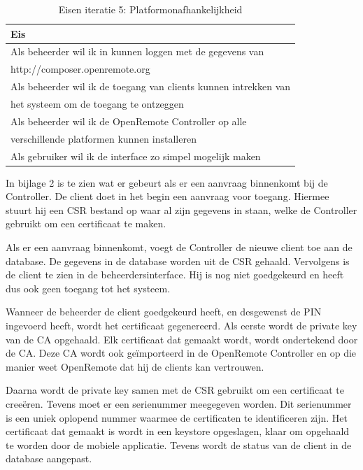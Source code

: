 \documentclass[]{article}
\begin{document}
\begin{table}[htpb]
  \caption{Eisen iteratie 5: Platformonafhankelijkheid}
  \begin{center}
    \begin{tabular}{|| l ||}\hline
        Eis                                                              \\\hline\hline
        Als beheerder wil ik in kunnen loggen met de gegevens van        \\
        http://composer.openremote.org                                   \\\hline
        Als beheerder wil ik de toegang van clients kunnen intrekken van \\ 
        het systeem om de toegang te ontzeggen                           \\\hline
        Als beheerder wil ik de OpenRemote Controller op alle            \\ 
        verschillende platformen kunnen installeren                      \\\hline
        Als gebruiker wil ik de interface zo simpel mogelijk maken       \\\hline
    \end{tabular}
  \end{center}
\end{table}

In bijlage 2 is te zien wat er gebeurt als er een
aanvraag binnenkomt bij de Controller. De client doet in het begin een aanvraag
voor toegang. Hiermee stuurt hij een CSR bestand op waar al zijn gegevens in staan,
welke de Controller gebruikt om een certificaat te maken. 

Als er een aanvraag binnenkomt, voegt de Controller de nieuwe client toe aan de
database. De gegevens in de database worden uit de CSR gehaald. Vervolgens is de
client te zien in de beheerdersinterface. Hij is nog niet
goedgekeurd en heeft dus ook geen toegang tot het systeem.

Wanneer de beheerder de client goedgekeurd heeft, en desgewenst de PIN ingevoerd
heeft, wordt het certificaat gegenereerd. Als eerste
wordt de private key van de CA opgehaald. Elk certificaat dat gemaakt wordt,
wordt ondertekend door de CA. Deze CA wordt ook ge\"importeerd in de OpenRemote
Controller en op die manier weet OpenRemote dat hij de clients kan vertrouwen.

Daarna wordt de private key samen met de CSR gebruikt om een certificaat te
cree\"eren. Tevens moet er een serienummer meegegeven worden. Dit serienummer is een
uniek oplopend nummer waarmee de certificaten te identificeren zijn. Het
certificaat dat gemaakt is wordt in een keystore
opgeslagen, klaar om opgehaald te worden door de mobiele applicatie. Tevens wordt de
status van de client in de database aangepast.
\end{document}
